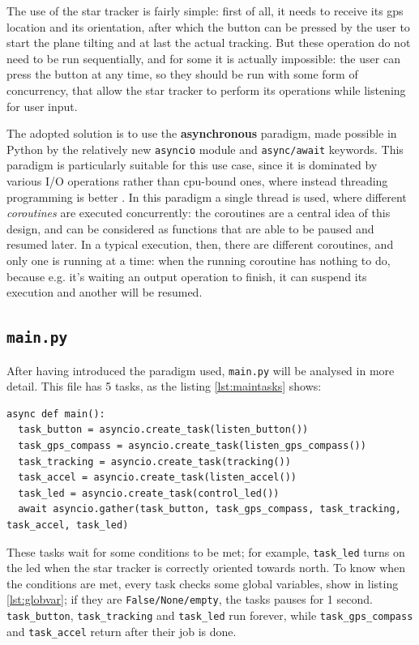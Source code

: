 \documentclass[]{article}
\begin{document}
The use of the star tracker is fairly simple: first of all, it needs to receive its gps location and its orientation, after which the button can be pressed by the user to start the plane tilting and at last the actual tracking. But these operation do not need to be run sequentially, and for some it is actually impossible: the user can press the button at any time, so they should be run with some form of concurrency, that allow the star tracker to perform its operations while listening for user input. 

The adopted solution is to use the \textbf{asynchronous} paradigm, made possible in Python by the relatively new \texttt{asyncio} module and \texttt{async/await} keywords. This paradigm is particularly suitable for this use case, since it is dominated by various I/O operations rather than cpu-bound ones, where instead threading programming is better \cite{asyncpython}. In this paradigm a single thread is used, where different \textit{coroutines} are executed concurrently: the coroutines are a central idea of this design, and can be considered as functions that are able to be paused and resumed later. In a typical execution, then, there are different coroutines, and only one is running at a time: when the running coroutine has nothing to do, because e.g. it's waiting an output operation to finish, it can suspend its execution and another will be resumed.

\subsection{\texttt{main.py}}

After having introduced the paradigm used, \texttt{main.py} will be analysed in more detail. This file has 5 tasks, as the listing \ref{lst:maintasks} shows:

\begin{lstlisting}[language=PythonPlus, label={lst:maintasks}, caption=main tasks]
async def main():
  task_button = asyncio.create_task(listen_button()) 
  task_gps_compass = asyncio.create_task(listen_gps_compass())
  task_tracking = asyncio.create_task(tracking())
  task_accel = asyncio.create_task(listen_accel())
  task_led = asyncio.create_task(control_led())
  await asyncio.gather(task_button, task_gps_compass, task_tracking, task_accel, task_led) 
\end{lstlisting}


These tasks wait for some conditions to be met; for example, \texttt{task\_led} turns on the led when the star tracker is correctly oriented towards north. To know when the conditions are met, every task checks some global variables, show in listing \ref{lst:globvar}; if they are \texttt{False/None/empty}, the tasks pauses for 1 second. \texttt{task\_button}, \texttt{task\_tracking} and \texttt{task\_led} run forever, while \texttt{task\_gps\_compass} and \texttt{task\_accel} return after their job is done. 
\end{document}
